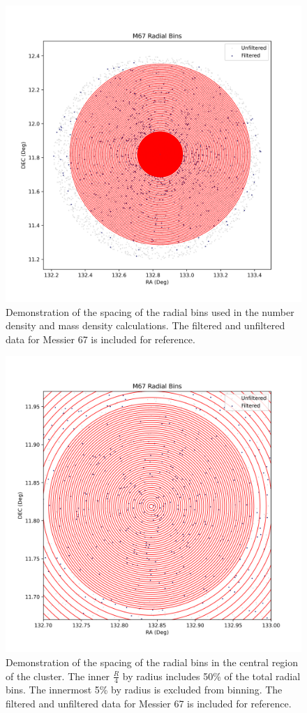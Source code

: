 \documentclass[onecolumn,table,xcdraw,super]{aastex631}
\begin{document}
\begin{figure}[]
    \centering
      \includegraphics[width=4.75in]{figures/M67_radialBins.png}
    \caption{Demonstration of the spacing of the radial bins used in the number density and mass density calculations. The filtered and unfiltered data for Messier 67 is included for reference.}
    \label{fig:radBins}
\end{figure}

\begin{figure}[]
    \centering
      \includegraphics[width=4.75in]{figures/M67_radialBins_center.png}
    \caption{Demonstration of the spacing of the radial bins in the central region of the cluster. The inner $\frac{R}{4}$ by radius includes 50\% of the total radial bins. The innermost 5\% by radius is excluded from binning. The filtered and unfiltered data for Messier 67 is included for reference.}
    \label{fig:radBinsCenter}
\end{figure}
\end{document}
